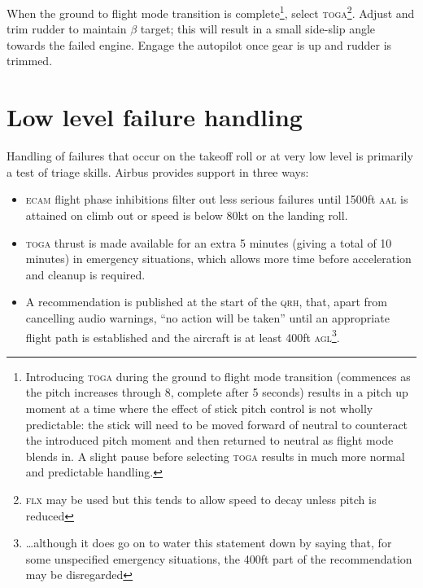 \documentclass[a5paper,11pt,twoside]{book}
\newcommand{\ac}[1]{{\scshape\MakeLowercase{#1}}}
\begin{document}
When the ground to flight mode transition is complete\footnote{Introducing
\ac{TOGA} during the ground to flight mode transition (commences as the pitch
increases through 8\textdegree, complete after 5 seconds) results in a pitch up
moment at a time where the effect of stick pitch control is not wholly
predictable: the stick will need to be moved forward of neutral to counteract
the introduced pitch moment and then returned to neutral as flight mode blends
in. A slight pause before selecting \ac{TOGA} results in much more normal and
predictable handling.}, select \ac{TOGA}\footnote{\ac{FLX} may be used but this
tends to allow speed to decay unless pitch is reduced}. Adjust and trim rudder
to maintain $\beta$ target; this will result in a small side-slip angle towards
the failed engine. Engage the autopilot once gear is up and rudder is trimmed.


\section{Low level failure handling}
\label{sec-failures-after-v1}

Handling of failures that occur on the takeoff roll or at very low level is
primarily a test of triage skills. Airbus provides support in three ways:

\begin{itemize}
\item \ac{ECAM} flight phase inhibitions filter out less serious failures until
  1500ft \ac{AAL} is attained on climb out or speed is below 80kt on the landing
  roll.
\item \ac{TOGA} thrust is made available for an extra 5 minutes (giving a total
  of 10 minutes) in emergency situations, which allows more time before
  acceleration and cleanup is required.
\item A recommendation is published at the start of the \ac{QRH}, that, apart
  from cancelling audio warnings, ``no action will be taken'' until an
  appropriate flight path is established and the aircraft is at least 400ft
  \ac{AGL}\footnote{\ldots although it does go on to water this statement down
  by saying that, for some unspecified emergency situations, the 400ft part of
  the recommendation may be disregarded}.
\end{itemize}
\end{document}

